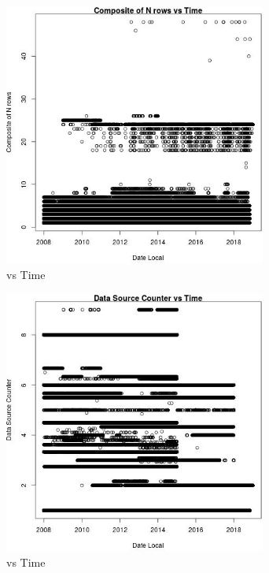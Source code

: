 \begin{figure} 
\centering  
\includegraphics[width=0.77\textwidth]{Code_Outputs/Report_PM25_Step4_part_e_de_duplicated_aves_ML_input_Composite_of_N_rowsvDate_Local.jpg} 
\caption{\label{fig:Report_PM25_Step4_part_e_de_duplicated_aves_ML_inputComposite_of_N_rowsvDate_Local}vs Time} 
\end{figure} 
 

\begin{figure} 
\centering  
\includegraphics[width=0.77\textwidth]{Code_Outputs/Report_PM25_Step4_part_e_de_duplicated_aves_ML_input_Data_Source_CountervDate_Local.jpg} 
\caption{\label{fig:Report_PM25_Step4_part_e_de_duplicated_aves_ML_inputData_Source_CountervDate_Local}vs Time} 
\end{figure} 
 

